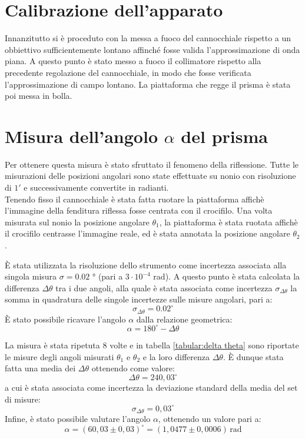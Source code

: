 \documentclass{article}
\begin{document}
    \section{Calibrazione dell'apparato}

        Innanzitutto si è proceduto con la messa a fuoco del cannocchiale rispetto a un obbiettivo sufficientemente lontano 
        affinché fosse valida l'approssimazione di onda piana. A questo punto è stato messo a fuoco il collimatore 
        rispetto alla precedente regolazione del cannocchiale, in modo che fosse verificata l'approssimazione di campo lontano. 
        La piattaforma che regge il prisma è stata poi messa in bolla. \\


    \section{Misura dell'angolo $\alpha$ del prisma}

        Per ottenere questa misura è stato sfruttato il fenomeno della riflessione. Tutte le misurazioni delle posizioni angolari sono state effettuate
        su nonio con risoluzione di $1'$ e  successivamente  convertite in radianti. \\
        Tenendo fisso il cannocchiale è stata fatta ruotare la piattaforma affichè l'immagine della fenditura riflessa fosse centrata 
        con il crocifilo. Una volta misurata sul nonio la posizione angolare $\theta_1$, la piattaforma è stata ruotata affichè il crocifilo 
        centrasse l'immagine reale, ed è stata annotata la posizione angolare $\theta_2$.
        
        È stata utilizzata la risoluzione dello strumento come incertezza associata alla singola misura $\sigma = 0.02$ ° (pari a $3 \cdot 10^{-4}$ rad). 
        A questo punto è stata calcolata la differenza $\Delta\theta$ tra i due angoli, alla quale è stata associata come incertezza $\sigma_{\Delta\theta}$ 
        la somma in quadratura delle singole incertezze sulle misure angolari, pari a: \[ \sigma_{\Delta\theta} = 0.02 ^\circ \]
        È stato possibile ricavare l'angolo $\alpha$ dalla relazione geometrica: \[ \alpha = 180 ^\circ - \Delta\theta \]

        La misura è stata ripetuta 8 volte e in tabella \ref{tabular:delta theta} sono riportate le misure degli angoli misurati $\theta_1$ e $\theta_2$ 
        e la loro differenza $\Delta\theta$. È dunque stata fatta una media dei $\Delta\theta$ ottenendo come valore:
        \[ \Delta\theta = 240,03^\circ \] a cui è stata associata come incertezza la deviazione standard della media del set di misure:
        \[ \sigma_{\Delta\theta} = 0,03^\circ \]
        Infine, è stato possibile valutare l'angolo $\alpha$, ottenendo un valore pari a: 
        \[\alpha = (60,03\pm 0,03)^\circ = (1,0477\pm 0,0006)\, \mathrm{rad}\]
\end{document}
